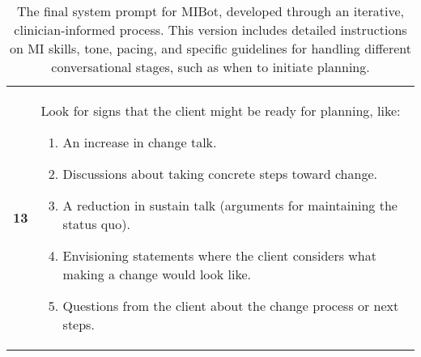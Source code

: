 \begin{table}
\begin{tcolorbox}
\begin{tabularx}{\linewidth}{r Y}
  \textbf{13} & Look for signs that the client might be ready for planning, like: 
      \begin{enumerate}[itemsep=0pt, parsep=0pt]
         \item An increase in change talk.
         \item Discussions about taking concrete steps toward change.
         \item A reduction in sustain talk (arguments for maintaining the status quo).
         \item Envisioning statements where the client considers what making a change would look like.
         \item Questions from the client about the change process or next steps.
      \end{enumerate} \\
  \end{tabularx}
  \end{tcolorbox}
    \caption[Final MIBot Prompt]{The final system prompt for MIBot, developed through an iterative, clinician-informed process. This version includes detailed instructions on MI skills, tone, pacing, and specific guidelines for handling different conversational stages, such as when to initiate planning.}
  \label{tab:final-system-prompt}
\end{table}